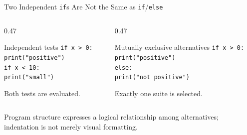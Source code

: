 \documentclass[aspectratio=169,10pt]{beamer}
\begin{document}
\begin{frame}{Two Independent \texttt{if}s Are Not the Same as \texttt{if}/\texttt{else}}
  \begin{columns}[T,onlytextwidth]
    \begin{column}{0.47\textwidth}
      \begin{block}{Independent tests}
        \texttt{if x > 0:}\\
        \hspace*{0.16in}\texttt{print("positive")}\\
        \texttt{if x < 10:}\\
        \hspace*{0.16in}\texttt{print("small")}
      \end{block}

      Both tests are evaluated.
    \end{column}

    \begin{column}{0.47\textwidth}
      \begin{block}{Mutually exclusive alternatives}
        \texttt{if x > 0:}\\
        \hspace*{0.16in}\texttt{print("positive")}\\
        \texttt{else:}\\
        \hspace*{0.16in}\texttt{print("not positive")}
      \end{block}

      Exactly one suite is selected.
    \end{column}
  \end{columns}

  \begin{keyidea}
    Program structure expresses a logical relationship among alternatives; indentation is not merely visual formatting.
  \end{keyidea}
\end{frame}

\end{document}
